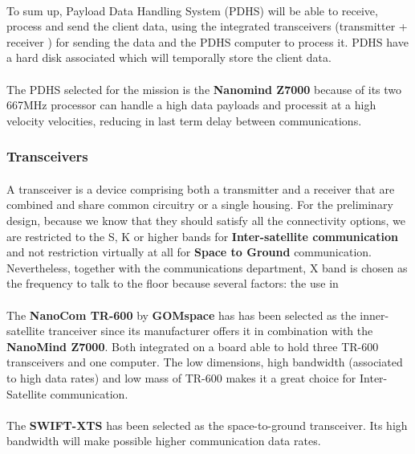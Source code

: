 \paragraph{}To sum up, Payload Data Handling System (PDHS) will be able to receive, process and send the client data, using the integrated transceivers (transmitter + receiver )  for sending the data and the PDHS computer to process it. PDHS have a hard disk associated which will temporally store the client data.

\paragraph{}The PDHS selected for the mission is the \textbf{Nanomind Z7000} because of its two 667MHz processor can handle a high data payloads and processit at a high velocity velocities, reducing in last term delay between communications. 

\subsubsection{Transceivers}
\paragraph{} A transceiver is a device comprising both a transmitter and a receiver that are combined and share common circuitry or a single housing. For the preliminary design, because we know that they should satisfy all the connectivity options, we are restricted to the S, K or higher bands for \textbf{Inter-satellite communication} and not restriction virtually at all for \textbf{Space to Ground} communication. Nevertheless, together with the communications department, X band is chosen as the frequency to talk to the floor because several factors: the use in 

\paragraph{}The \textbf{NanoCom TR-600} by \textbf{GOMspace} has has been selected as the inner-satellite tranceiver since its manufacturer offers it in combination with the \textbf{NanoMind Z7000}. Both integrated on a board able to hold three TR-600 transceivers and one computer. The low dimensions, high bandwidth (associated to high data rates) and low mass of TR-600 makes it a great choice for Inter-Satellite communication.

\paragraph{}The \textbf{SWIFT-XTS} has been selected as the space-to-ground transceiver. Its high bandwidth will make possible higher communication data rates.

